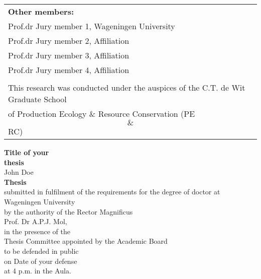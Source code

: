\begin{tabular}{l}
    \textbf{Other members:}                                                                   \\  
    Prof.dr Jury member 1, Wageningen University                                              \\  
    Prof.dr Jury member 2, Affiliation                                                        \\  
    Prof.dr Jury member 3, Affiliation                                                        \\  
    Prof.dr Jury member 4, Affiliation                                                        \\  
                                                                                              \\  

    \small{This research was conducted under the auspices of the C.T. de Wit Graduate School} \\  
    \small{of Production Ecology \& Resource Conservation (PE$$\&$$RC)}                         \\  
\end{tabular}

\newpage
\thispagestyle{empty}
\begin{center}
\Huge{\textbf{Title of your}} \\
\Huge{\textbf{thesis}} \\
\vspace*{1cm}
\Large{John Doe}\\
\normalsize
\vspace*{\fill}
\textbf{Thesis} \\
submitted in fulfilment of the requirements for the degree of doctor at \\
Wageningen University\\
by the authority of the Rector Magnificus\\
Prof. Dr A.P.J. Mol,\\
in the presence of the\\
Thesis Committee appointed by the Academic Board\\
to be defended in public\\
on Date of your defense\\
at 4 p.m. in the Aula.\\
\end{center}

